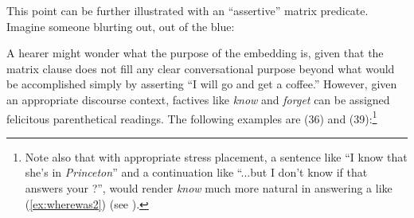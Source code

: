 \documentclass[output=paper]{langsci/langscibook}
\begin{document}
This point can be further illustrated with an ``assertive'' matrix predicate. Imagine someone blurting out, out of the blue:


A hearer might wonder what the purpose of the embedding is, given that the matrix clause does not fill any clear conversational purpose beyond what would be accomplished simply by asserting ``I will go and get a coffee.'' However, given an appropriate discourse context, factives like \textit{know} and \textit{forget} can be assigned felicitous parenthetical readings. The following examples are  (36) and (39):\footnote{Note also that with appropriate stress placement, a sentence like ``I know that she's in \textit{Princeton}'' and a continuation like ``...but I don't know if that answers your ?'', would render \textit{know} much more natural in answering a  like (\ref{ex:wherewas2}) (see \citealt[1049]{Simons2007}).} %



\end{document}
